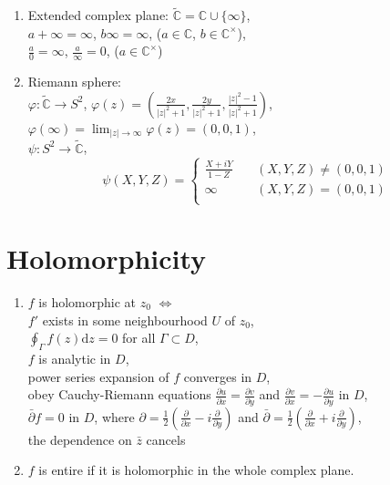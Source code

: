 \documentclass[11pt,a4paper]{article}
\begin{document}
\begin{multicols}{2}
\begin{enumerate}
\item Extended complex plane: $\tilde{\mathbb{C}} = \mathbb{C} \cup \{\infty\}$, \\
$a+\infty=\infty$, $b\infty = \infty$, ($a \in \mathbb{C}$, $b \in \mathbb{C}^{\times}$), \\
$\frac{a}{0} = \infty$, $\frac{a}{\infty} = 0$, ($a \in \mathbb{C}^{\times}$)

\item Riemann sphere: \\
$\varphi : \tilde{\mathbb{C}} \to S^2$, $\varphi(z) = \left( \frac{2x}{|z|^2+1}, \frac{2y}{|z|^2+1}, \frac{|z|^2-1}{|z|^2+1} \right)$, \\
$\varphi(\infty) = \displaystyle \lim_{|z| \to \infty} \varphi(z) = (0,0,1)$, \\
$\psi : S^2 \to \tilde{\mathbb{C}}$, \[\psi(X,Y,Z) = 
\begin{cases}
\frac{X+iY}{1-Z} & \quad (X,Y,Z) \neq (0,0,1) \\
\infty & \quad (X,Y,Z) = (0,0,1) \\
\end{cases}
\]
\end{enumerate}

\section*{Holomorphicity}
\begin{enumerate}[resume]
\item $f$ is holomorphic at $z_0$ $\Leftrightarrow$ \\
$f'$ exists in some neighbourhood $U$ of $z_0$, \\
$\oint_{\Gamma} f(z) \mathrm{d}z = 0$ for all $\Gamma \subset D$, \\
$f$ is analytic in $D$, \\
power series expansion of $f$ converges in $D$, \\
obey Cauchy-Riemann equations $\frac{\partial u}{\partial x} = \frac{\partial v}{\partial y}$ and $\frac{\partial v}{\partial x} = -\frac{\partial u}{\partial y}$ in $D$, \\
$\bar{\partial}f = 0$ in $D$, where $\partial = \frac{1}{2} \left( \frac{\partial}{\partial x} - i \frac{\partial}{\partial y} \right)$ and $\bar{\partial} = \frac{1}{2} \left( \frac{\partial}{\partial x} + i \frac{\partial}{\partial y} \right)$, \\
the dependence on $\bar{z}$ cancels

\item $f$ is entire if it is holomorphic in the whole complex plane. 


\end{enumerate}
\end{multicols}
\end{document}
